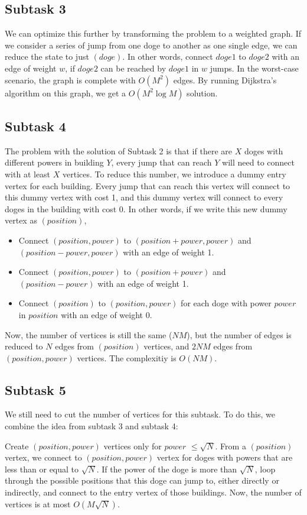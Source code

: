 \documentclass[a4paper]{article}
\begin{document}
\subsection*{Subtask 3}
We can optimize this further by transforming the problem to a weighted graph.
If we consider a series of jump from one doge to another as one single edge, we can reduce the state to just $(doge)$. In other words, connect $doge1$ to $doge2$ with an edge of weight $w$, if $doge2$ can be reached by $doge1$ in $w$ jumps. In the worst-case scenario, the graph is complete with $O(M^2)$ edges. By running Dijkstra's algorithm on this graph, we get a $O(M^2 \log M)$ solution.
\subsection*{Subtask 4}
The problem with the solution of Subtask 2 is that if there are $X$ doges with different powers in building $Y$, every jump that can reach $Y$ will need to connect with at least $X$ vertices. To reduce this number, we introduce a dummy entry vertex for each building. Every jump that can reach this vertex will connect to this dummy vertex with cost 1, and this dummy vertex will connect to every doges in the building with cost 0. In other words, if we write this new dummy vertex as $(position)$,
\begin{itemize}
    \item Connect $(position, power)$ to $(position + power, power)$ and $(position - power, power)$ with an edge of weight 1.
    \item Connect $(position, power)$ to $(position + power)$ and $(position - power)$ with an edge of weight 1.
    \item Connect $(position)$ to $(position, power)$ for each doge with power $power$ in $position$ with an edge of weight 0.
\end{itemize}
Now, the number of vertices is still the same ($NM$), but the number of edges is reduced to $N$ edges from $(position)$ vertices, and $2NM$ edges from $(position, power)$ vertices. The complexitiy is $O(NM)$.

\subsection*{Subtask 5}
We still need to cut the number of vertices for this subtask. To do this, we combine the idea from subtask 3 and subtask 4:

Create $(position, power)$ vertices only for $power$ $\leq \sqrt{N}$.
From a $(position)$ vertex, we connect to $(position, power)$ vertex for doges with powers that are less than or equal to $\sqrt{N}$.
If the power of the doge is more than $\sqrt{N}$, loop through the possible positions that this doge can jump to, either directly or indirectly, and connect to the entry vertex of those buildings.
Now, the number of vertices is at most $O(M\sqrt{N})$.
\end{document}
